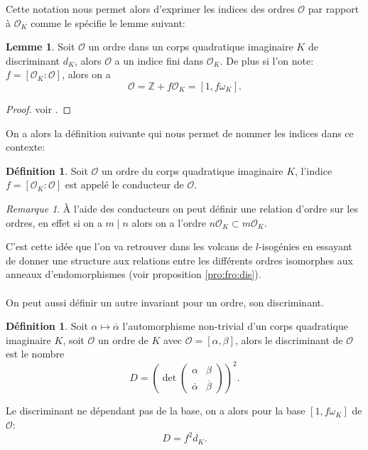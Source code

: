 \documentclass[10pt,a4paper]{book}
\theoremstyle{plain}
\theoremstyle{definition}
\newtheorem{lem}[thm]{Lemme}
\theoremstyle{definition}
\theoremstyle{definition}
\theoremstyle{definition}
\newtheorem{defi}[thm]{Définition}
\theoremstyle{remark}
\newtheorem{rem}[thm]{Remarque}
\theoremstyle{remark}
\begin{document}
Cette notation nous permet alors d'exprimer les indices des ordres $\mathcal{O}$ par rapport à $\mathcal{O}_K$ comme le spécifie le lemme suivant:

\begin{lem}
Soit $\mathcal{O}$ un ordre dans un corps quadratique imaginaire $K$ de discriminant $d_K$, alors $\mathcal{O}$ a un indice fini dans $\mathcal{O}_K$. De plus si l'on note: $f= [\mathcal{O}_K : \mathcal{O}]$, alors on a 
\[ \mathcal{O} = \mathbb{Z} + f\mathcal{O}_K = [1, f\omega_K]. \]
\end{lem}

\begin{proof}
voir \cite[lemma 7.7.2]{Cox89}.
\end{proof}

On a alors la définition suivante qui nous permet de nommer les indices dans ce contexte:
\begin{defi}
Soit $\mathcal{O}$ un ordre du corps quadratique imaginaire $K$, l'indice $f=[\mathcal{O}_K : \mathcal{O}]$ est appelé le conducteur de $\mathcal{O}$.
\end{defi}

\begin{rem}
\`A l'aide des conducteurs on peut définir une relation d'ordre sur les ordres, en effet si on a $m \mid n$ alors on a l'ordre $n\mathcal{O}_K \subset m\mathcal{O}_K$.
\end{rem}

C'est cette idée que l'on va retrouver dans les volcans de $l$-isogénies en essayant de donner une structure aux relations entre les différents ordres isomorphes aux anneaux d'endomorphismes (voir proposition \ref{pro:fro:dis}).
\\
\\
On peut aussi définir un autre invariant pour un ordre, son discriminant.

\begin{defi}
Soit $\alpha \mapsto \overline{\alpha}$ l'automorphisme non-trivial d'un corps quadratique imaginaire $K$, soit $\mathcal{O}$ un ordre de $K$ avec $\mathcal{O}=[\alpha, \beta]$, alors le discriminant de $\mathcal{O}$ est le nombre 
\[D= \left( \det \left( 
\begin{array}{cc}
\alpha & \beta\\
\overline{\alpha} & \overline{\beta}
\end{array} 
\right) \right)^2. \]
\end{defi}
Le discriminant ne dépendant pas de la base, on a alors pour la base $[1, f \omega_K]$ de $\mathcal{O}$:
\[D=f^2d_K.\]
\end{document}
